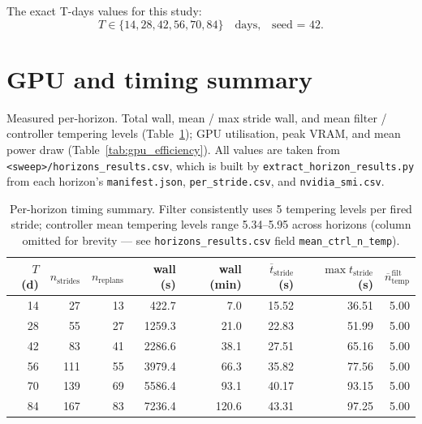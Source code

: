 \documentclass[11pt,a4paper]{article}
\begin{document}
The exact T-days values for this study:
\[ T \in \{14, 28, 42, 56, 70, 84\} \quad \text{days,} \quad \text{seed = 42}. \]


\section{GPU and timing summary}
\label{sec:gpu}

Measured per-horizon. Total wall, mean / max stride wall, and mean
filter / controller tempering levels (Table~\ref{tab:gpu_timing});
GPU utilisation, peak VRAM, and mean power draw
(Table~\ref{tab:gpu_efficiency}). All values are taken from
\texttt{<sweep>/horizons\_results.csv}, which is built by
\texttt{extract\_horizon\_results.py} from each horizon's
\texttt{manifest.json}, \texttt{per\_stride.csv}, and
\texttt{nvidia\_smi.csv}.

\begin{table}[ht]
\centering
\small
\begin{tabular}{rrrrrrrr}
\toprule
$T$ (d) & $n_{\mathrm{strides}}$ & $n_{\mathrm{replans}}$ & wall (s) & wall (min) & $\overline{t}_{\mathrm{stride}}$ (s) & $\max t_{\mathrm{stride}}$ (s) & $\overline{n}^{\mathrm{filt}}_{\mathrm{temp}}$ \\
\midrule
14 & 27  & 13 & 422.7  & 7.0   & 15.52 & 36.51 & 5.00 \\
28 & 55  & 27 & 1259.3 & 21.0  & 22.83 & 51.99 & 5.00 \\
42 & 83  & 41 & 2286.6 & 38.1  & 27.51 & 65.16 & 5.00 \\
56 & 111 & 55 & 3979.4 & 66.3  & 35.82 & 77.56 & 5.00 \\
70 & 139 & 69 & 5586.4 & 93.1  & 40.17 & 93.15 & 5.00 \\
84 & 167 & 83 & 7236.4 & 120.6 & 43.31 & 97.25 & 5.00 \\
\bottomrule
\end{tabular}
\caption{Per-horizon timing summary. Filter consistently uses 5
tempering levels per fired stride; controller mean tempering levels
range 5.34--5.95 across horizons (column omitted for brevity --- see
\texttt{horizons\_results.csv} field
\texttt{mean\_ctrl\_n\_temp}).}
\label{tab:gpu_timing}
\end{table}
\end{document}
